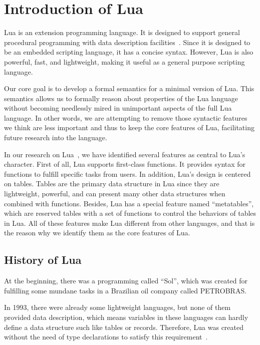 \chapter{Introduction of Lua}
Lua is an extension programming language. It is designed to support general procedural programming with data description facilities~\cite{EEL}. Since it is designed to be an embedded scripting language, it has a concise syntax. However, Lua is also powerful, fast, and lightweight, making it useful as a general purpose scripting language.

Our core goal is to develop a formal semantics for a minimal version of Lua. This semantics allows us to formally reason about properties of the Lua language without becoming needlessly mired in unimportant aspects of the full Lua language. In other words, we are attempting to remove those syntactic features we think are less important and thus to keep the core features of Lua, facilitating future research into the language.


In our research on Lua~\cite{LRM}, we have identified several features as central to Lua's character. First of all, Lua supports first-class functions. It provides syntax for functions to fulfill specific tasks from users. In addition, Lua's design is centered on tables. Tables are the primary data structure in Lua since they are lightweight, powerful, and can present many other data structures when combined with functions. Besides, Lua has a special feature named ``metatables'', which are reserved tables with a set of functions to control the behaviors of tables in Lua. All of these features make Lua different from other languages, and that is the reason why we identify them as the core features of Lua.

\section{History of Lua}
At the beginning, there was a programming called ``Sol'', which was created for fulfilling some mundane tasks in a Brazilian oil company called PETROBRAS. 

In 1993, there were already some lightweight languages, but none of them provided data description, which means variables in these languages can hardly define a data structure such like tables or records. Therefore, Lua was created without the need of type declarations to satisfy this requirement~\cite{EOL}.

